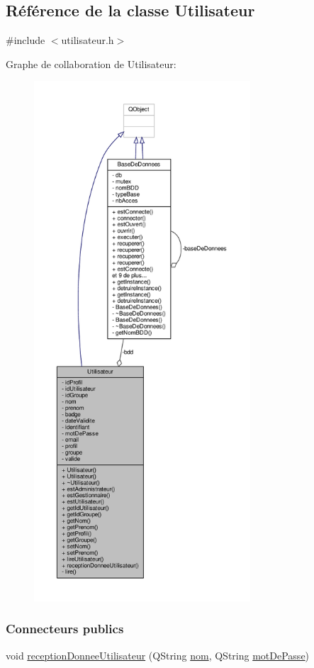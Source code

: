 \hypertarget{class_utilisateur}{}\subsection{Référence de la classe Utilisateur}
\label{class_utilisateur}


{\ttfamily \#include $<$utilisateur.\+h$>$}



Graphe de collaboration de Utilisateur\+:\nopagebreak
\begin{figure}[H]
\begin{center}
\leavevmode
\includegraphics[height=550pt]{class_utilisateur__coll__graph}
\end{center}
\end{figure}
\subsubsection*{Connecteurs publics}
\begin{DoxyCompactItemize}
\item 
void \hyperlink{class_utilisateur_a81311d8a9f62ffdfb8ee65d37461ea17}{reception\+Donnee\+Utilisateur} (Q\+String \hyperlink{class_utilisateur_a1096e809aca4b7cf453a7af93cb72502}{nom}, Q\+String \hyperlink{class_utilisateur_a4f6a17d0fb5c231bcb414396236a056f}{mot\+De\+Passe})
\end{DoxyCompactItemize}
